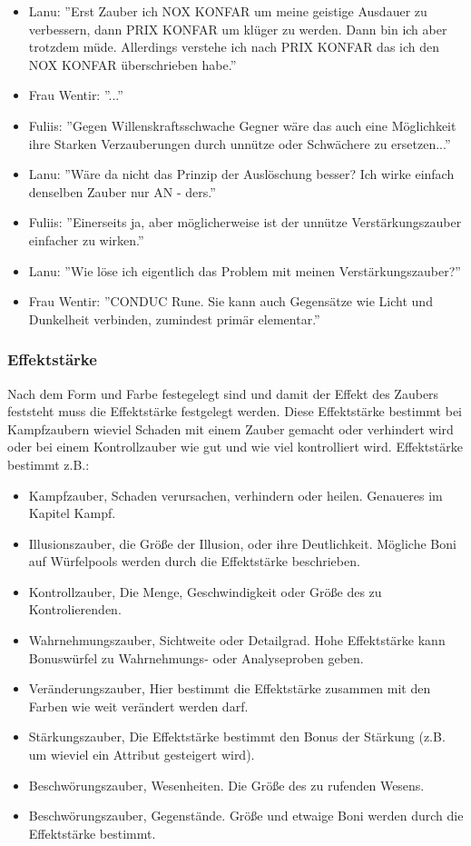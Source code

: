 \documentclass{article}
\begin{document}
\begin{itemize}
\item Lanu: ''Erst Zauber ich NOX KONFAR um meine geistige Ausdauer zu verbessern, dann PRIX KONFAR um klüger zu werden. Dann bin ich aber trotzdem müde. Allerdings verstehe ich nach PRIX KONFAR das ich den NOX KONFAR überschrieben habe.''
\item Frau Wentir: ''...''
\item Fuliis: ''Gegen Willenskraftsschwache Gegner wäre das auch eine Möglichkeit ihre Starken Verzauberungen durch unnütze oder Schwächere zu ersetzen...''
\item Lanu: ''Wäre da nicht das Prinzip der Auslöschung besser? Ich wirke einfach denselben Zauber nur AN - ders.''
\item Fuliis: ''Einerseits ja, aber möglicherweise ist der unnütze Verstärkungszauber einfacher zu wirken.''
\item Lanu: ''Wie löse ich eigentlich das Problem mit meinen Verstärkungszauber?''
\item Frau Wentir: ''CONDUC Rune. Sie kann auch Gegensätze wie Licht und Dunkelheit verbinden, zumindest primär elementar.''
\end{itemize}

\subsubsection{Effektstärke}

Nach dem Form und Farbe festegelegt sind und damit der Effekt des Zaubers feststeht muss die Effektstärke festgelegt
werden. Diese Effektstärke bestimmt bei Kampfzaubern wieviel Schaden mit einem Zauber gemacht oder verhindert wird
oder bei einem Kontrollzauber wie gut und wie viel kontrolliert wird. Effektstärke bestimmt z.B.:

\begin{itemize}
\item Kampfzauber, Schaden verursachen, verhindern oder heilen. Genaueres im Kapitel Kampf.
\item Illusionszauber, die Größe der Illusion, oder ihre Deutlichkeit. Mögliche Boni auf Würfelpools werden durch die Effektstärke beschrieben.
\item Kontrollzauber, Die Menge, Geschwindigkeit oder Größe des zu Kontrolierenden.
\item Wahrnehmungszauber, Sichtweite oder Detailgrad. Hohe Effektstärke kann Bonuswürfel zu Wahrnehmungs- oder Analyseproben geben.
\item Veränderungszauber, Hier bestimmt die Effektstärke zusammen mit den Farben wie weit verändert werden darf.
\item Stärkungszauber, Die Effektstärke bestimmt den Bonus der Stärkung (z.B. um wieviel ein Attribut gesteigert wird).
\item Beschwörungszauber, Wesenheiten. Die Größe des zu rufenden Wesens.
\item Beschwörungszauber, Gegenstände. Größe und etwaige Boni werden durch die Effektstärke bestimmt.
\end{itemize}
\end{document}

